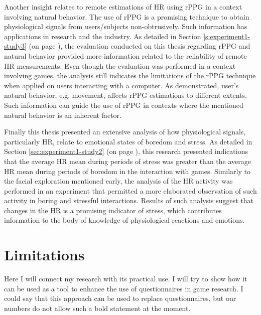 Another insight relates to remote estimations of HR using rPPG in a context involving natural behavior. The use of rPPG is a promising technique to obtain physiological signals from users/subjects non-obtrusively. Such information has applications in research and the industry. As detailed in Section \ref{s:experiment1-study3} (on page \pageref{s:experiment1-study3}), the evaluation conducted on this thesis regarding rPPG and natural behavior provided more information related to the reliability of remote HR measurements. Even though the evaluation was performed in a context involving games, the analysis still indicates the limitations of the rPPG technique when applied on users interacting with a computer. As demonstrated, user's natural behavior, e.g. movement, affects rPPG estimations to different extents. Such information can guide the use of rPPG in contexts where the mentioned natural behavior is an inherent factor.

Finally this thesis presented an extensive analysis of how physiological signals, particularly HR, relate to emotional states of boredom and stress. As detailed in Section \ref{sec:experiment1-study2} (on page \pageref{sec:experiment1-study2}), this research presented indications that the average HR mean during periods of stress was greater than the average HR mean during periods of boredom in the interaction with games. Similarly to the facial exploration mentioned early, the analysis of the HR activity was performed in an experiment that permitted a more elaborated observation of such activity in boring and stressful interactions. Results of such analysis suggest that changes in the HR is a promising indicator of stress, which contributes information to the body of knowledge of physiological reactions and emotions.

\section{Limitations}

Here I will connect my research with its practical use. I will try to show how it can be used as a tool to enhance the use of questionnaires in game research. I could say that this approach can be used to replace questionnaires, but our numbers do not allow such a bold statement at the moment.

